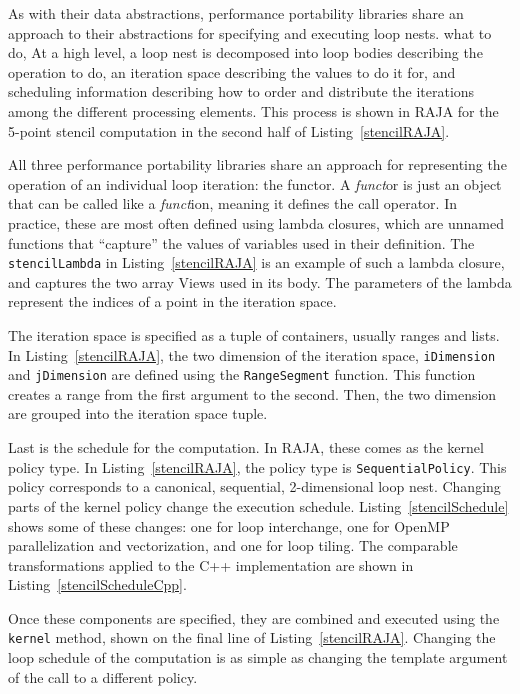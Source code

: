 As with their data abstractions, performance portability libraries share an approach to their abstractions for specifying and executing loop nests.
what to do, 
At a high level, a loop nest is decomposed into loop bodies describing the operation to do, an iteration space describing the values to do it for, and scheduling information describing how to order and distribute the iterations among the different processing elements.
This process is shown in RAJA for the 5-point stencil computation in the second half of Listing~\ref{stencilRAJA}.

All three performance portability libraries share an approach for representing the operation of an individual loop iteration: the functor.
A \textit{funct}or is just an object that can be called like a \textit{funct}ion, meaning it defines the call operator. 
In practice, these are most often defined using lambda closures, which are unnamed functions that ``capture'' the values of variables used in their definition.
The \verb.stencilLambda. in Listing~\ref{stencilRAJA} is an example of such a lambda closure, and captures the two array Views used in its body.
The parameters of the lambda represent the indices of a point in the iteration space.

The iteration space is specified as a tuple of containers, usually ranges and lists.
In Listing~\ref{stencilRAJA}, the two dimension of the iteration space, \verb.iDimension. and \verb.jDimension. are defined using the \verb.RangeSegment. function.
This function creates a range from the first argument to the second.
Then, the two dimension are grouped into the iteration space tuple.

Last is the schedule for the computation.
In RAJA, these comes as the kernel policy type.
In Listing~\ref{stencilRAJA}, the policy type is \verb.SequentialPolicy..
This policy corresponds to a canonical, sequential, 2-dimensional loop nest.
Changing parts of the kernel policy change the execution schedule.  %
Listing~\ref{stencilSchedule} shows some of these changes: one for loop interchange, one for OpenMP parallelization and vectorization, and one for loop tiling.
The comparable transformations applied to the C++ implementation are shown in Listing~\ref{stencilScheduleCpp}.

Once these components are specified, they are combined and executed using the \verb.kernel. method, shown on the final line of Listing~\ref{stencilRAJA}.
Changing the loop schedule of the computation is as simple as changing the template argument of the call to a different policy.

